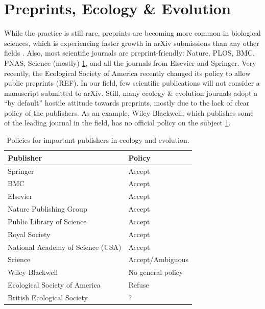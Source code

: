 \documentclass[letterpaper,twocolumn,superscriptaddress,showkeys]{revtex4}
\begin{document}
\section{Preprints, Ecology \& Evolution}

While the practice is still rare, preprints are becoming more common in
biological sciences, which is experiencing faster growth in arXiv submissions
than any other fields \cite{cal12}. Also, most scientific journals are
preprint-friendly: Nature, PLOS, BMC, PNAS, Science (mostly)
\ref{table:policies}, and all the journals from Elsevier and Springer. Very
recently, the Ecological Society of America recently changed its policy to allow
public preprints (REF). In our field, few scientific publications will not
consider a manuscript submitted to arXiv. Still, many ecology \& evolution journals
adopt a ``by default'' hostile attitude towards preprints, mostly due to the
lack of clear policy of the publishers. As an example, Wiley-Blackwell, which
publishes some of the leading journal in the field, has no official policy on
the subject \ref{table:policies}.

\begin{table}
    \centering
    \begin{tabular}{|ll|}
    \hline
    Publisher                                   & Policy \\
    \hline
    Springer                            	& Accept \\
    BMC                                 	& Accept \\
    Elsevier                            	& Accept \\
    Nature Publishing Group             	& Accept \\
    Public Library of Science           	& Accept \\
    Royal Society                       	& Accept \\
    National Academy of Science (USA)           & Accept \\
    Science                             	& Accept/Ambiguous \\
    Wiley-Blackwell                       	& No general policy \\
    Ecological Society of America       	& Refuse \\
    British Ecological Society                  & ? \\
    \hline
    \end{tabular}
    \caption{Policies for important publishers in ecology and evolution.}
    \label{table:policies}
\end{table}
\end{document}
